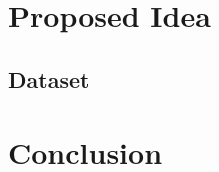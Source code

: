 \documentclass[conference]{IEEEtran}
\begin{document}



\section{Proposed Idea}
    \subsection{Dataset}
    

    \pagebreak

\section{Conclusion}

    \pagebreak


\end{document}
